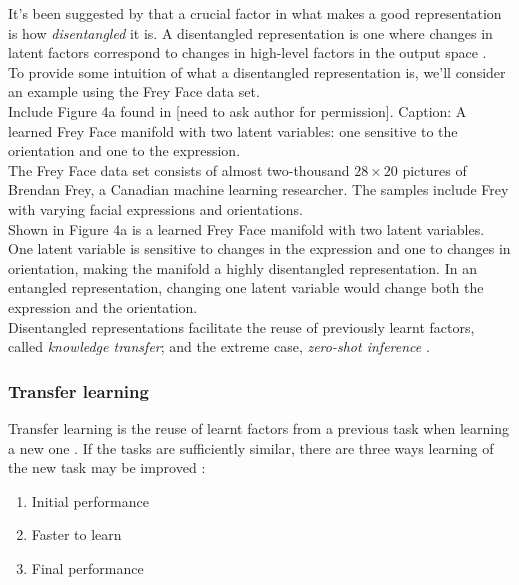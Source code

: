 \documentclass[12pt,twoside]{article}
\begin{document}
It's been suggested by \cite{Bengio2013} that a crucial factor in what makes a good representation is how \textit{disentangled} it is. A disentangled representation is one where changes in latent factors correspond to changes in high-level factors in the output space \cite{Higgins2016}.\\

To provide some intuition of what a disentangled representation is, we'll consider an example using the Frey Face data set.\\

Include Figure 4a found in \cite{Kingma2014} [need to ask author for permission]. Caption: A learned Frey Face manifold with two latent variables: one sensitive to the orientation and one to the expression.\\

The Frey Face data set consists of almost two-thousand $28\times20$ pictures of Brendan Frey, a Canadian machine learning researcher. The samples include Frey with varying facial expressions and orientations.\\

Shown in Figure 4a is a learned Frey Face manifold with two latent variables. One latent variable is sensitive to changes in the expression and one to changes in orientation, making the manifold a highly disentangled representation. In an entangled representation, changing one latent variable would change both the expression and the orientation.\\

Disentangled representations facilitate the reuse of previously learnt factors, called \textit{knowledge transfer}; and the extreme case, \textit{zero-shot inference} \cite{IanGoodfellowYoshuaBengio2015,Higgins2016}.

\subsubsection{Transfer learning}
Transfer learning is the reuse of learnt factors from a previous task when learning a new one \cite{IanGoodfellowYoshuaBengio2015}. If the tasks are sufficiently similar, there are three ways learning of the new task may be improved \cite{Torrey2009}:

\begin{enumerate}
\item Initial performance
\item Faster to learn
\item Final performance
\end{enumerate}
\end{document}
